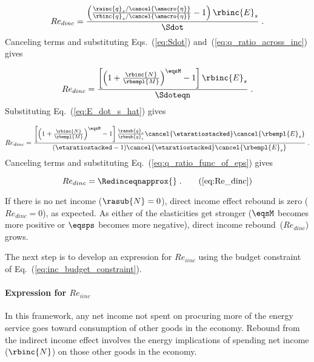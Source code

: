 \begin{equation}
  Re_{dinc} = \frac{\left( \frac{\rainc{q}_s / \cancel{\amacro{\eta}}}{\rbinc{q}_s / \cancel{\amacro{\eta}}} - 1  \right) \rbinc{E}_s} 
              {\Sdot} \; .
\end{equation}
%
Canceling terms and substituting Eqs.~(\ref{eq:Sdot}) and~(\ref{eq:q_ratio_across_inc}) gives

\begin{equation}
  Re_{dinc} = \frac{\left[ \left( 1 + \frac{\rbinc{N}}{\rbempl{M}} \right) ^{\eqsM} - 1  \right] \rbinc{E}_s} 
              {\Sdoteqn} \; .
\end{equation}
%
Substituting Eq.~(\ref{eq:E_dot_s_hat}) gives

\begin{equation}
  Re_{dinc} = \frac{\left[ \left( 1 + \frac{\rbinc{N}}{\rbempl{M}} \right) ^{\eqsM} - 1  \right] 
                  \frac{\rasub{q}_s}{\rbsub{q}_s}
                \cancel{\etaratiostacked}
                \cancel{\rbempl{E}_s}}
              {\left( \etaratiostacked - 1 \right)\! \cancel{\etaratiostacked} \cancel{\rbempl{E}_s}} \; .
\end{equation}
%
Canceling terms and substituting Eq.~(\ref{eq:q_ratio_func_of_eps}) gives

\begin{equation} 
  Re_{dinc} = \Redinceqnapprox{} \; . \tag{\ref{eq:Re_dinc}}
\end{equation}

If there is no net income ($\rasub{N} = 0$), 
direct income effect rebound is zero ($Re_{dinc} = 0$), as expected.
As either of the elasticities get stronger 
($\eqsM$ becomes more positive or $\eqsps$ becomes more negative), 
direct income rebound~($Re_{dinc}$) grows.

The next step is to develop an expression for $Re_{iinc}$
using the budget constraint of Eq.~(\ref{eq:inc_budget_constraint}).

\paragraph{Expression for $Re_{iinc}$}
\label{sec:Re_iinc}

In this framework,
any net income not spent on procuring more of the energy service
goes toward consumption of other goods in the economy.
Rebound from the indirect income effect involves 
the energy implications of spending net income ($\rbinc{N}$)
on those other goods in the economy.

